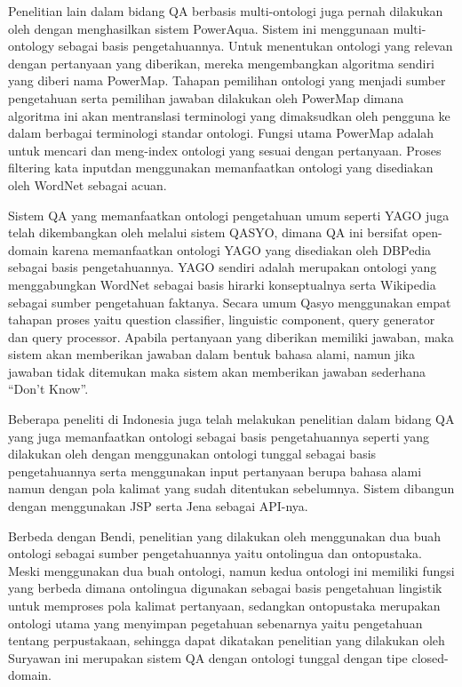 Penelitian lain dalam bidang QA berbasis multi-ontologi juga pernah dilakukan oleh \citet*{lopez} dengan menghasilkan sistem PowerAqua. Sistem ini menggunaan multi-ontology sebagai basis pengetahuannya. Untuk menentukan ontologi yang relevan dengan pertanyaan yang diberikan, mereka  mengembangkan algoritma sendiri yang diberi nama PowerMap. Tahapan pemilihan ontologi yang menjadi sumber pengetahuan serta pemilihan jawaban dilakukan oleh PowerMap dimana algoritma ini akan mentranslasi terminologi yang dimaksudkan oleh pengguna ke dalam berbagai terminologi standar ontologi. Fungsi utama PowerMap adalah untuk mencari dan meng-index ontologi yang sesuai dengan pertanyaan. Proses filtering kata inputdan menggunakan memanfaatkan ontologi yang disediakan oleh WordNet sebagai acuan.

Sistem QA yang memanfaatkan ontologi pengetahuan umum seperti YAGO juga telah dikembangkan oleh \citet*{moussa_kader} melalui sistem QASYO, dimana QA ini bersifat open-domain karena memanfaatkan ontologi YAGO yang disediakan oleh DBPedia sebagai basis pengetahuannya. YAGO sendiri adalah merupakan ontologi yang menggabungkan WordNet sebagai basis hirarki konseptualnya serta Wikipedia sebagai sumber pengetahuan faktanya. Secara umum Qasyo menggunakan empat tahapan proses yaitu question classifier, linguistic component, query generator dan query processor. Apabila pertanyaan yang diberikan memiliki jawaban, maka sistem akan memberikan jawaban dalam bentuk bahasa alami, namun jika jawaban tidak ditemukan maka sistem akan memberikan jawaban sederhana ``Don't Know''.

Beberapa peneliti di Indonesia juga telah melakukan penelitian dalam bidang QA yang juga memanfaatkan ontologi sebagai basis pengetahuannya seperti yang dilakukan oleh \citet{bendi} dengan menggunakan ontologi tunggal sebagai basis pengetahuannya serta menggunakan input pertanyaan berupa bahasa alami namun dengan pola kalimat yang sudah ditentukan sebelumnya. Sistem dibangun dengan menggunakan JSP serta Jena sebagai API-nya.

Berbeda dengan Bendi, penelitian yang dilakukan oleh \citet{suryawan} menggunakan dua buah ontologi sebagai sumber pengetahuannya yaitu ontolingua dan ontopustaka. Meski menggunakan dua buah ontologi, namun kedua ontologi ini memiliki fungsi yang berbeda dimana ontolingua digunakan sebagai basis pengetahuan lingistik untuk memproses pola kalimat pertanyaan, sedangkan ontopustaka merupakan ontologi utama yang menyimpan pegetahuan sebenarnya yaitu pengetahuan tentang perpustakaan, sehingga dapat dikatakan penelitian yang dilakukan oleh Suryawan ini merupakan sistem QA dengan ontologi tunggal dengan tipe closed-domain.

